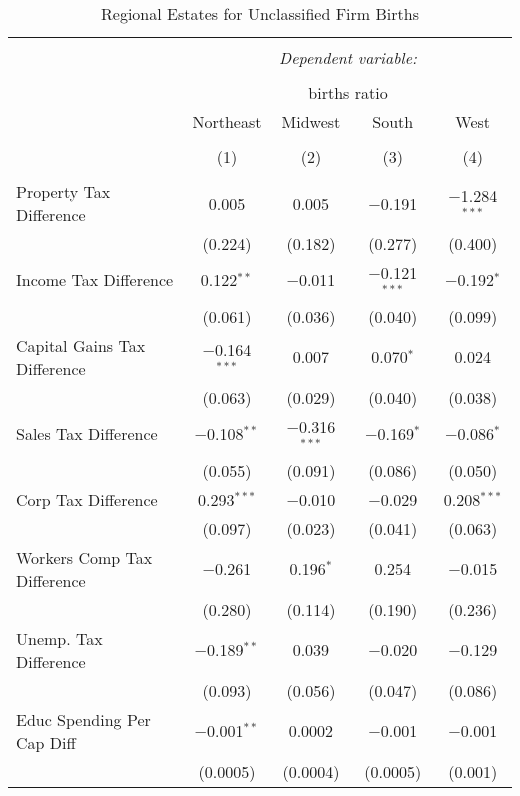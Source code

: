 
\begin{table}[!htbp] \centering 
  \caption{Regional Estates for  Unclassified Firm Births} 
  \label{} 
\begin{tabular}{@{\extracolsep{5pt}}lcccc} 
\\[-1.8ex]\hline 
\hline \\[-1.8ex] 
 & \multicolumn{4}{c}{\textit{Dependent variable:}} \\ 
\cline{2-5} 
\\[-1.8ex] & \multicolumn{4}{c}{births ratio} \\ 
 & Northeast & Midwest & South & West \\ 
\\[-1.8ex] & (1) & (2) & (3) & (4)\\ 
\hline \\[-1.8ex] 
 Property Tax Difference & 0.005 & 0.005 & $-$0.191 & $-$1.284$^{***}$ \\ 
  & (0.224) & (0.182) & (0.277) & (0.400) \\ 
  Income Tax Difference & 0.122$^{**}$ & $-$0.011 & $-$0.121$^{***}$ & $-$0.192$^{*}$ \\ 
  & (0.061) & (0.036) & (0.040) & (0.099) \\ 
  Capital Gains Tax Difference & $-$0.164$^{***}$ & 0.007 & 0.070$^{*}$ & 0.024 \\ 
  & (0.063) & (0.029) & (0.040) & (0.038) \\ 
  Sales Tax Difference & $-$0.108$^{**}$ & $-$0.316$^{***}$ & $-$0.169$^{*}$ & $-$0.086$^{*}$ \\ 
  & (0.055) & (0.091) & (0.086) & (0.050) \\ 
  Corp Tax Difference & 0.293$^{***}$ & $-$0.010 & $-$0.029 & 0.208$^{***}$ \\ 
  & (0.097) & (0.023) & (0.041) & (0.063) \\ 
  Workers Comp Tax Difference & $-$0.261 & 0.196$^{*}$ & 0.254 & $-$0.015 \\ 
  & (0.280) & (0.114) & (0.190) & (0.236) \\ 
  Unemp. Tax Difference & $-$0.189$^{**}$ & 0.039 & $-$0.020 & $-$0.129 \\ 
  & (0.093) & (0.056) & (0.047) & (0.086) \\ 
  Educ Spending Per Cap Diff & $-$0.001$^{**}$ & 0.0002 & $-$0.001 & $-$0.001 \\ 
  & (0.0005) & (0.0004) & (0.0005) & (0.001) \\ 

\end{tabular}
\end{table}
